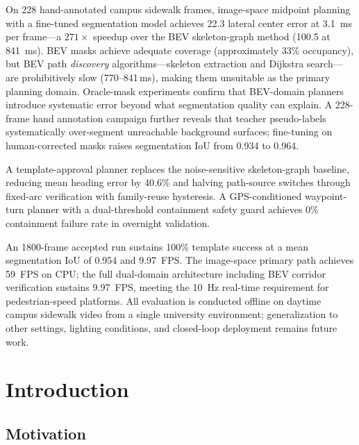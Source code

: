 \documentclass[12pt,letterpaper,oneside]{report}
\begin{document}
On 228 hand-annotated campus sidewalk frames, image-space midpoint planning with a fine-tuned segmentation model achieves \SI{22.3}{\px} lateral center error at \SI{3.1}{ms} per frame---a $271\times$ speedup over the BEV skeleton-graph method (\SI{100.5}{\px} at \SI{841}{ms}). BEV masks achieve adequate coverage (approximately 33\% occupancy), but BEV path \emph{discovery} algorithms---skeleton extraction and Dijkstra search---are prohibitively slow (770--841\,ms), making them unsuitable as the primary planning domain. Oracle-mask experiments confirm that BEV-domain planners introduce systematic error beyond what segmentation quality can explain.  A 228-frame hand annotation campaign further reveals that teacher pseudo-labels systematically over-segment unreachable background surfaces; fine-tuning on human-corrected masks raises segmentation IoU from 0.934 to 0.964.

A template-approval planner replaces the noise-sensitive skeleton-graph baseline, reducing mean heading error by 40.6\% and halving path-source switches through fixed-arc verification with family-reuse hysteresis. A GPS-conditioned waypoint-turn planner with a dual-threshold containment safety guard achieves 0\% containment failure rate in overnight validation.

An 1800-frame accepted run sustains 100\% template success at a mean segmentation IoU of 0.954 and 9.97~FPS. The image-space primary path achieves 59~FPS on CPU; the full dual-domain architecture including BEV corridor verification sustains 9.97~FPS, meeting the 10~Hz real-time requirement for pedestrian-speed platforms. All evaluation is conducted offline on daytime campus sidewalk video from a single university environment; generalization to other settings, lighting conditions, and closed-loop deployment remains future work.

\newpage


\chapter{Introduction}
\label{ch:introduction}

\section{Motivation}
\end{document}
